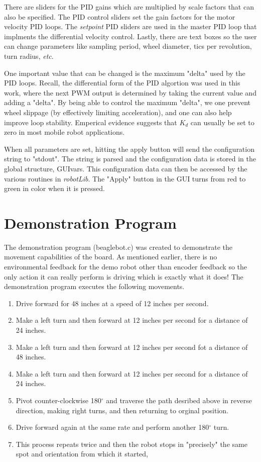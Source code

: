 \documentclass[12pt,oneside,final]{siuethesis}
\theoremstyle{definition}
\begin{document}
There are sliders for the PID gains which are multiplied by scale factors that can also be specified. The PID control sliders set the gain factors for the motor velocity PID loops. The \emph{setpoint} PID sliders are used in the master PID loop that implments the differential velocity control.  Lastly, there are text boxes so the user can change parameters like sampling period, wheel diameter, tics per revolution, turn radius, \emph{etc}. 

One important value that can be changed is the maximum "delta" used by the PID loops.  Recall, the differential form of the PID algortion was used in this work, where the next PWM output is determined by taking the current value and adding a "delta".  By being able to control the maximum "delta", we one prevent wheel slippage (by effectively limiting acceleration), and one can also help improve loop stability.  Emperical evidence suggests that $K_d$ can usually be set to zero in most mobile robot applications.  

When all parameters are set, hitting the apply button will send the configuration string to "stdout". The string is parsed and the configuration data is stored in the global structure, GUIvars. This configuration data can then be accessed by the various routines in \emph{robotLib}. The "Apply" button in the GUI turns from red to green in color when it is pressed. 

\section{Demonstration Program}

The demonstration program (beaglebot.c) was created to demonstrate the movement capabilities of the board. As mentioned earlier, there is no environmental feedback for the demo robot other than encoder feedback so the only action it can really perform is driving which is exactly what it does!  The demonstration program executes the following movements.

\begin{enumerate}
\item
Drive forward for 48 inches at a speed of 12 inches per second.
\item
Make a left turn and then forward at 12 inches per second for a distance of 24 inches.
\item
Make a left turn and then forward at 12 inches per second fot a distance of 48 inches.
\item
Make a left turn and then forward at 12 inches per second for a distance of 24 inches.
\item
Pivot counter-clockwise 180$^{\circ}$ and traverse the path desribed above in reverse direction, making right turns, and then returning to orginal position.
\item
Drive forward again at the same rate and perform another 180$^{\circ}$ turn.
\item
This process repeats twice and then the robot stops in "precisely" the same spot and orientation from which it started,
\end{enumerate}
\end{document}
